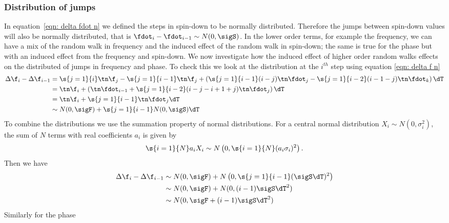 \subsubsection{Distribution of jumps}
In equation~\eqref{eqn: delta fdot n}  we defined the steps in spin-down to be
normally distributed. Therefore the jumps between spin-down values will also be
normally distributed, that is $\fdot_{i} - \fdot_{i-1} \sim N(0, \sigS)$. In
the lower order terms, for example the frequency, we can have a mix of the
random walk in frequency and the induced effect of the random walk in spin-down;
the same is true for the phase but with an induced effect from the frequency
and spin-down.  We now investigate how the induced effect of higher order random
walks effects on the distributed of jumps in frequency and phase. To check this
we  look at the distribution at the $i^{th}$ step using equation 
\eqref{eqn: delta f n}
\begin{align}
\Delta \f_{i} - \Delta \f_{i-1} & = \s{j=1}{i}\tn \f_{j}
-  \s{j=1}{i-1}\tn \f_{j} + \left(\s{j=1}{i-1}(i-j)\tn \fdot_{j}  
-  \s{j=1}{i-2}(i-1-j)\tn \fdot_{k} \right)\dT  \\
& = \tn \f_{i} + \left(\tn \fdot_{i-1} 
+ \s{j=1}{i-2}(i-j-i+1+j)\tn \fdot_{j}\right)\dT \\
& = \tn \f_{i} + \s{j=1}{i-1}\tn \fdot_{j} \dT \\
& \sim N(0, \sigF) + \s{j=1}{i-1}N(0, \sigS) \dT 
\end{align}
To combine the distributions we use the summation property of normal
distributions. For a central normal distribution $X_{i}\sim N(0,
\sigma_{i}^{2})$, the sum of $N$ terms with real coefficients $a_{i}$ is given
by 
\begin{equation}
\s{i=1}{N}a_{i}X_{i} \sim N\left(0, \s{i=1}{N}(a_{i}\sigma_{i})^{2}\right).
\end{equation}
Then we have
\begin{align}
\Delta \f_{i} - \Delta \f_{i-1} & \sim N(0, \sigF) 
+ N\left(0, \s{j=1}{i-1}(\sigS\dT)^{2}\right) \\
& \sim N(0, \sigF) + N(0, (i-1)\sigS\dT^{2}) \\
& \sim N(0, \sigF + (i-1)\sigS\dT^2)  
\end{align}
Similarly for the phase 
